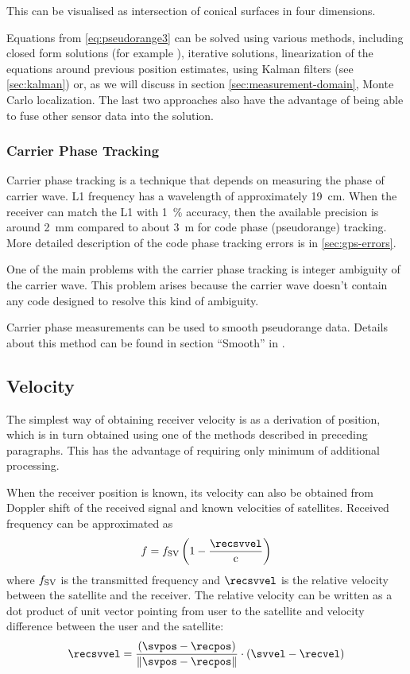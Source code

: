 This can be visualised as intersection of conical surfaces in four dimensions.

Equations from \eqref{eq:pseudorange3} can be solved using various methods, including closed form solutions
(for example \cite{leva96}), iterative solutions, linearization of the equations around
previous position estimates, using Kalman filters (see \ref{sec:kalman}) or,
as we will discuss in section \ref{sec:measurement-domain}, Monte Carlo localization.
The last two approaches also have the advantage of being able to fuse other sensor data
into the solution.

\subsubsection{Carrier Phase Tracking}
\label{sec:gps-carrier-phase}

Carrier phase tracking is a technique that depends on measuring the phase of carrier wave.
L1 frequency has a wavelength of approximately \SI{19}{\centi\meter}.
When the receiver can match the L1 with \SI{1}{\percent} accuracy, then the available precision
is around \SI{2}{\milli\meter} compared to about \SI{3}{\meter} for code phase (pseudorange)
tracking. More detailed description of the code phase tracking errors is in \cref{sec:gps-errors}.

One of the main problems with the carrier phase tracking is integer ambiguity of the carrier wave.
This problem arises because the carrier wave doesn't contain any code designed to resolve
this kind of ambiguity.

Carrier phase measurements can be used to smooth pseudorange data.
Details about this method can be found in section \enquote{Smooth} in \cite{sam-www}.

\subsection{Velocity}
The simplest way of obtaining receiver velocity is as a derivation of
position, which is in turn obtained using one of the methods described in preceding paragraphs.
This has the advantage of requiring only minimum of additional processing.

When the receiver position is known, its velocity can also be obtained from Doppler shift of
the received signal and known velocities of satellites.
Received frequency can be approximated as
\begin{equation}
	f = f_\SV \left(1 - \frac{\recsvvel}{\speedoflight}\right)
	\label{eq:doppler}
\end{equation}
where \(f_{\mathrm{SV}}\) is the transmitted frequency and \(\recsvvel\) is the relative velocity
between the satellite and the receiver.
The relative velocity can be written as a dot product of unit vector pointing
from user to the satellite and velocity difference between the user and the satellite:
\begin{equation}
	\recsvvel = \frac{
		(\svpos - \recpos)
	}{
		\norm{\svpos - \recpos}
	} \cdot (\svvel - \recvel)
	\label{eq:doppler-velocity}
\end{equation}

